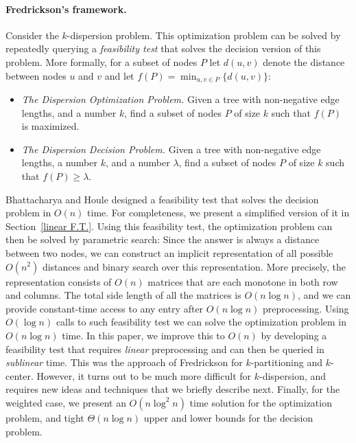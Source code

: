 \documentclass[11pt,a4paper]{article}
\newcommand{\Oh}{{O}}
\theoremstyle{definition}
\theoremstyle{remark}
\begin{document}
\vspace{-0.1in}
\paragraph{Fredrickson's framework.}
Consider the $k$-dispersion problem. This optimization problem can be solved by repeatedly querying a {\em feasibility test} that solves the decision version of this problem. More formally, for a subset of nodes $P$ let $d(u,v)$ denote the distance between nodes $u$ and $v$ and let $f(P)=\min_{u,v\in P} \{d(u,v)\}$:


\begin{itemize} 
\item {\em The Dispersion Optimization Problem.} Given a tree with non-negative edge lengths, and a  number $k$, find a subset of nodes $P$ of size $k$  such that  $f(P)$ is maximized. 

\item  {\em The Dispersion Decision Problem.}  Given a tree with non-negative edge lengths, a number $k$, and a number $\lambda$, find a subset of nodes  $P$ of size $k$ such that  $f(P)\geq\lambda$. 
\end{itemize}

Bhattacharya and Houle designed a feasibility test that solves the decision problem in $\Oh(n)$ time. For completeness, we present a simplified version of it in Section~\ref{linear F.T.}.
Using this feasibility test, the optimization problem can then be solved by parametric search: Since the answer is always
a distance between two nodes, we can construct an implicit representation of all possible $O(n^{2})$ distances and binary search over this representation. More precisely, the representation consists of $O(n)$ matrices that are each monotone in both row and columns. The total side length
of all the matrices is $O(n\log n)$, and we can provide constant-time access to any entry after $O(n\log n)$ preprocessing. Using $O(\log n)$ calls to such feasibility test we can solve the optimization problem in $O(n\log n)$ time. 
%
In this paper, we improve this to $O(n)$ by developing a feasibility test that requires {\em linear} preprocessing and can then be queried in \emph{sublinear} time. This was the approach of Fredrickson for $k$-partitioning and $k$-center. However, it turns out to be much more difficult for $k$-dispersion, and requires new ideas and techniques that we briefly describe next. Finally, for the weighted case, we present an $\Oh(n\log^2n)$ time solution for the optimization problem, and tight $\Theta(n\log n)$ upper and lower bounds for the decision problem. 
\end{document}
